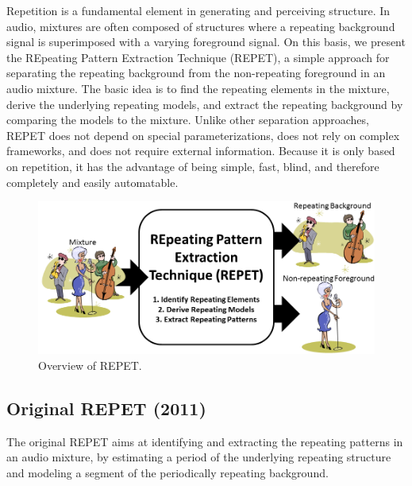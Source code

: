 \documentclass{article}
\begin{document}
Repetition is a fundamental element in generating and perceiving structure. In audio, mixtures are often composed of structures where a repeating background signal is superimposed with a varying foreground signal. On this basis, we present the REpeating Pattern Extraction Technique (REPET), a simple approach for separating the repeating background from the non-repeating foreground in an audio mixture. The basic idea is to find the repeating elements in the mixture, derive the underlying repeating models, and extract the repeating background by comparing the models to the mixture. Unlike other separation approaches, REPET does not depend on special parameterizations, does not rely on complex frameworks, and does not require external information. Because it is only based on repetition, it has the advantage of being simple, fast, blind, and therefore completely and easily automatable.

\begin{figure}[!htb]
\centering
\includegraphics[width=\columnwidth]{Images/repet.png}
\caption{Overview of REPET.}
\label{fig:repet}
\end{figure}

\subsection{Original REPET (2011)}
\label{ssec:repet_original}

The original REPET aims at identifying and extracting the repeating patterns in an audio mixture, by estimating a period of the underlying repeating structure and modeling a segment of the periodically repeating background.
\end{document}
